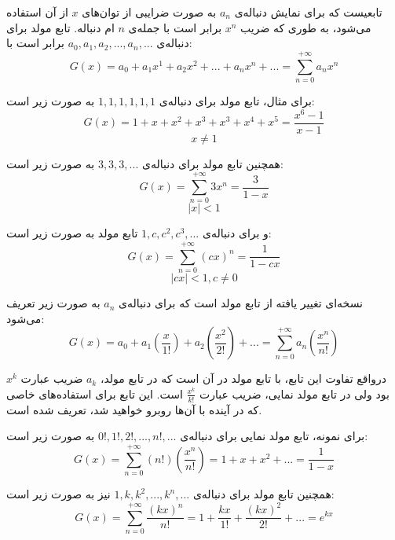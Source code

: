 
\begin{DEFINITION}
    \p
    تابعیست که برای نمایش دنباله‌ی 
    $a_{n}$ 
    به صورت ضرایبی از توان‌های 
    $x$
    از آن استفاده می‌شود، به طوری که ضریب 
    $x^{n}$
    برابر است با جمله‌ی
    $n$
    ام دنباله. تابع مولد برای دنباله‌ی 
    $a_{0}, a_{1}, a_{2}, ..., a_{n}, ... $
    برابر است با:
        $$G(x)= a_{0} + a_{1}x^{1} + a_{2}x^{2} + ... + a_{n}x^{n} + ... = \sum\limits_{n=0}^{+\infty} a_{n}x^{n}$$
\end{DEFINITION}
\p
برای مثال،
تابع مولد برای دنباله‌ی 
$1, 1, 1, 1, 1, 1$ 
به صورت زیر است:
    $$G(x)= 1 + x + x^2 + x^3 + x^3 + x^4 + x^5 = \frac{x^6-1}{x-1}$$
    $$x \neq 1$$

همچنین
تابع مولد برای دنباله‌ی 
$3, 3, 3, ...$
به صورت زیر است: 
    $$G(x)= \sum\limits_{n=0}^{+\infty} 3x^{n} = \frac{3}{1-x}$$
    $$|x| < 1$$

و برای دنباله‌ی 
$1, c, c^2, c^3, ...$
تابع مولد به صورت زیر است: 
    $$G(x)= \sum\limits_{n=0}^{+\infty} (cx)^{n} = \frac{1}{1-cx}$$
    $$|cx| < 1 , c \neq 0$$









\begin{DEFINITION}
    \p
    نسخه‌ای تغییر یافته از تابع مولد است که
    برای دنباله‌ی 
    $a_{n}$
    به صورت زیر تعریف می‌شود:
      $$G(x)= a_{0} + a_{1}(\frac{x}{1!}) + a_{2}(\frac{x^{2}}{2!}) + ... = \sum\limits_{n=0}^{+\infty} a_{n}(\frac{x^{n}}{n!})$$
\end{DEFINITION}
\p
درواقع تفاوت این تابع، با تابع مولد در آن است که در تابع مولد،
$a_k$
ضریب عبارت
$x^k$
بود ولی در تابع مولد نمایی، ضریب عبارت
$\frac{x^k}{k!}$
است.
این تابع برای
استفاده‌های خاصی که در آینده با آن‌ها روبرو خواهید شد،
تعریف شده است.

\p
برای نمونه،
تابع مولد نمایی برای دنباله‌ی 
$0!, 1!, 2!, ..., n!, ...$ 
به صورت زیر است:
    $$G(x)= \sum\limits_{n=0}^{+\infty} (n!)(\frac{x^{n}}{n!}) = 1 + x + x^{2} + ... = \frac{1}{1-x}$$	

همچنین تابع مولد برای دنباله‌ی 
$1, k, k^{2}, ..., k^{n}, ...$
نیز به صورت زیر است: 
    $$G(x)= \sum\limits_{n=0}^{+\infty} \frac{(kx)^{n}}{n!} = 1 + \frac{kx}{1!} + \frac{(kx)^{2}}{2!} + ... = e^{kx}$$
